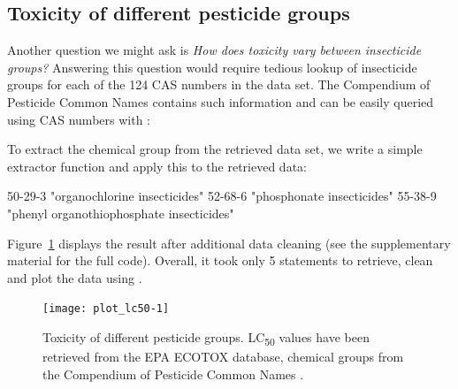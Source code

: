 \documentclass[article]{jss}
\begin{document}
\subsection[Toxicity of different pesticide groups]{Toxicity of different pesticide groups}
Another question we might ask is \emph{How does toxicity vary between
  insecticide groups?}  Answering this question would require tedious
lookup of insecticide groups for each of the 124 CAS numbers in the
 data set.  The Compendium of Pesticide Common Names
\citep{wood} contains such information and can be easily queried using
CAS numbers with :
%
\begin{CodeChunk}
\end{CodeChunk}
%
To extract the chemical group from the retrieved data set, we write a simple extractor function and apply this to the retrieved data:
%
\begin{CodeChunk}
\begin{CodeOutput}
                                  50-29-3 
            "organochlorine insecticides" 
                                  52-68-6 
               "phosphonate insecticides" 
                                  55-38-9 
"phenyl organothiophosphate insecticides" 
\end{CodeOutput}
\end{CodeChunk}
%
Figure~\ref{fig:fig2} displays the result after additional data
cleaning (see the supplementary material for the full code).  Overall, it
took only 5  statements to retrieve, clean and plot the
data using  \citep{ggplot2}.

\begin{figure}[t!]
  \centering
  \texttt{[image: plot\_lc50-1]} 
\caption{Toxicity of different pesticide groups. LC\textsubscript{50}
  values have been retrieved from the EPA ECOTOX database, chemical groups
  from the Compendium of Pesticide Common Names \citep{wood}.}
\label{fig:fig2}
\end{figure}
\end{document}
